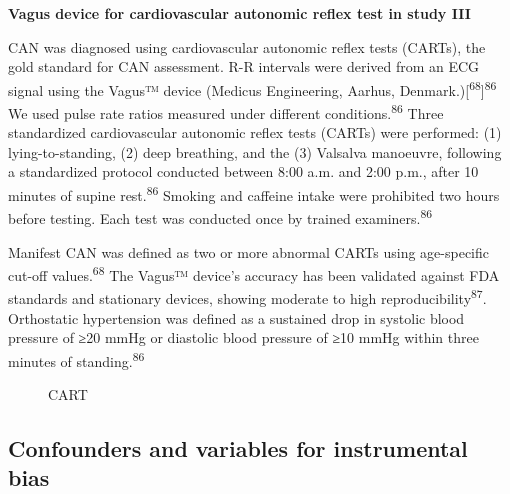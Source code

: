 \documentclass[
  letterpaper,
  headsepline=true,
  open=any]{scrbook}
\begin{document}
\textbf{Vagus device for cardiovascular autonomic reflex test in study
III}

CAN was diagnosed using cardiovascular autonomic reflex tests (CARTs),
the gold standard for CAN assessment. R-R intervals were derived from an
ECG signal using the Vagus™ device (Medicus Engineering, Aarhus,
Denmark.){[}\textsuperscript{68}{]}\textsuperscript{86} We used pulse
rate ratios measured under different conditions.\textsuperscript{86}
Three standardized cardiovascular autonomic reflex tests (CARTs) were
performed: (1) lying-to-standing, (2) deep breathing, and the (3)
Valsalva manoeuvre, following a standardized protocol conducted between
8:00 a.m. and 2:00 p.m., after 10 minutes of supine
rest.\textsuperscript{86} Smoking and caffeine intake were prohibited
two hours before testing. Each test was conducted once by trained
examiners.\textsuperscript{86}

Manifest CAN was defined as two or more abnormal CARTs using
age-specific cut-off values.\textsuperscript{68} The Vagus™ device's
accuracy has been validated against FDA standards and stationary
devices, showing moderate to high reproducibility\textsuperscript{87}.
Orthostatic hypertension was defined as a sustained drop in systolic
blood pressure of ≥20 mmHg or diastolic blood pressure of ≥10 mmHg
within three minutes of standing.\textsuperscript{86}

\begin{figure}

\begin{minipage}[t]{\linewidth}

{\centering 


\caption{CART}

}

\end{minipage}%

\end{figure}

\hypertarget{confounders-and-variables-for-instrumental-bias}{%
\subsection{Confounders and variables for instrumental
bias}\label{confounders-and-variables-for-instrumental-bias}}
\end{document}
